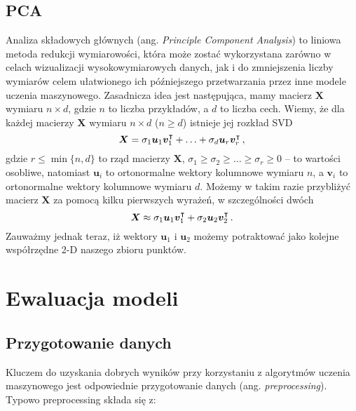 \documentclass{myclass}
\begin{document}
\subsection{PCA}

Analiza składowych głównych (ang. \emph{Principle Component Analysis}) to liniowa metoda redukcji
wymiarowości, która może zostać wykorzystana zarówno w celach wizualizacji wysokowymiarowych danych,
jak i do zmniejszenia liczby wymiarów celem ułatwionego ich późniejszego przetwarzania przez inne
modele uczenia maszynowego. Zasadnicza idea jest następująca, mamy macierz \(\bm{X}\) wymiaru \(n
\times d\), gdzie \(n\) to liczba przykładów, a \(d\) to liczba cech. Wiemy, że dla każdej macierzy
\(\bm{X}\) wymiaru \(n \times d\) (\(n \geq d\)) istnieje jej rozkład SVD 
\[
    \bm{X} = \sigma_1 \bm{u}_1 \bm{v}_1^\intercal + \ldots + \sigma_d \bm{u}_{r} \bm{v}_r^\intercal\,,
\]
gdzie \(r \leq \min\{n,d\}\) to rząd macierzy \(\bm{X}\), \(\sigma_1 \geq \sigma_2 \geq \ldots \geq
\sigma_r \geq 0\) -- to wartości osobliwe, natomiast \(\bm{u}_i\) to ortonormalne wektory kolumnowe
wymiaru \(n\), a \(\bm{v}_i\) to ortonormalne wektory kolumnowe wymiaru \(d\). Możemy w takim razie
przybliżyć macierz \(\bm{X}\) za pomocą kilku pierwszych wyrażeń, w szczególności dwóch
\[
    \bm{X} \approx \sigma_1 \bm{u}_1 \bm{v}_1^\intercal + \sigma_2 \bm{u}_2 \bm{v}_2^\intercal\,.
\]
Zauważmy jednak teraz, iż wektory \(\bm{u}_1\) i \(\bm{u}_2\) możemy potraktować jako kolejne
współrzędne 2-D naszego zbioru punktów.


\section{Ewaluacja modeli}

\subsection{Przygotowanie danych}

Kluczem do uzyskania dobrych wyników przy korzystaniu z algorytmów uczenia maszynowego jest
odpowiednie przygotowanie danych (ang. \emph{preprocessing}). Typowo preprocessing składa się z:
\end{document}
